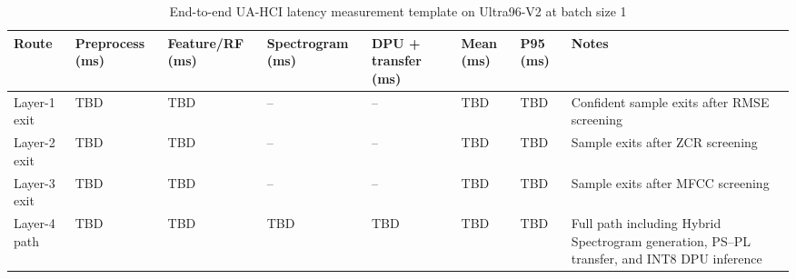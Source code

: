 \begin{table}[!t]
\centering
\caption{End-to-end UA-HCI latency measurement template on Ultra96-V2 at batch size 1}
\label{tab:e2e_latency}
\footnotesize
\setlength{\tabcolsep}{3pt}
\renewcommand{\arraystretch}{1.15}
\begin{tabularx}{\textwidth}{@{}p{2.0cm}p{1.8cm}p{1.8cm}p{1.8cm}p{1.8cm}p{1.6cm}p{1.6cm}X@{}}
\toprule
\textbf{Route} & \textbf{Preprocess (ms)} & \textbf{Feature/RF (ms)} & \textbf{Spectrogram (ms)} & \textbf{DPU + transfer (ms)} & \textbf{Mean (ms)} & \textbf{P95 (ms)} & \textbf{Notes} \\
\midrule
Layer-1 exit & TBD & TBD & -- & -- & TBD & TBD & Confident sample exits after RMSE screening \\
Layer-2 exit & TBD & TBD & -- & -- & TBD & TBD & Sample exits after ZCR screening \\
Layer-3 exit & TBD & TBD & -- & -- & TBD & TBD & Sample exits after MFCC screening \\
Layer-4 path & TBD & TBD & TBD & TBD & TBD & TBD & Full path including Hybrid Spectrogram generation, PS--PL transfer, and INT8 DPU inference \\
\bottomrule
\end{tabularx}
\end{table}
